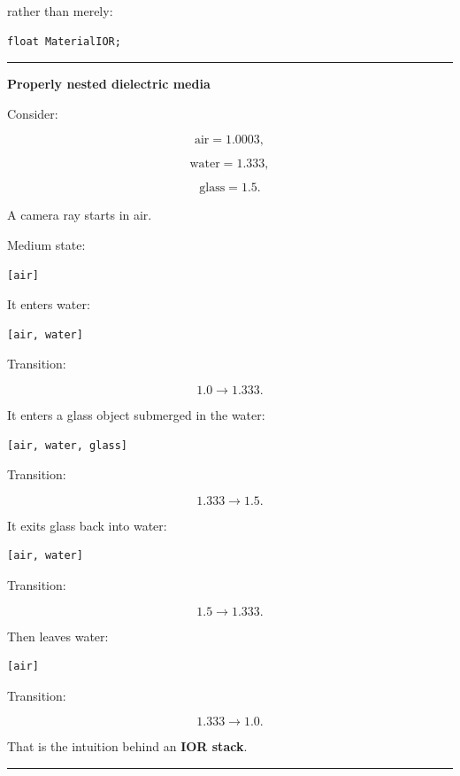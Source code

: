 rather than merely:

\begin{verbatim}
float MaterialIOR;
\end{verbatim}

\begin{center}\rule{0.5\linewidth}{0.5pt}\end{center}

\textbf{Properly nested dielectric media}

Consider:

\[
\text{air}=1.0003,
\]

\[
\text{water}=1.333,
\]

\[
\text{glass}=1.5.
\]

A camera ray starts in air.

Medium state:

\begin{verbatim}
[air]
\end{verbatim}

It enters water:

\begin{verbatim}
[air, water]
\end{verbatim}

Transition:

\[
1.0\rightarrow1.333.
\]

It enters a glass object submerged in the water:

\begin{verbatim}
[air, water, glass]
\end{verbatim}

Transition:

\[
1.333\rightarrow1.5.
\]

It exits glass back into water:

\begin{verbatim}
[air, water]
\end{verbatim}

Transition:

\[
1.5\rightarrow1.333.
\]

Then leaves water:

\begin{verbatim}
[air]
\end{verbatim}

Transition:

\[
1.333\rightarrow1.0.
\]

That is the intuition behind an \textbf{IOR stack}.

\begin{center}\rule{0.5\linewidth}{0.5pt}\end{center}

